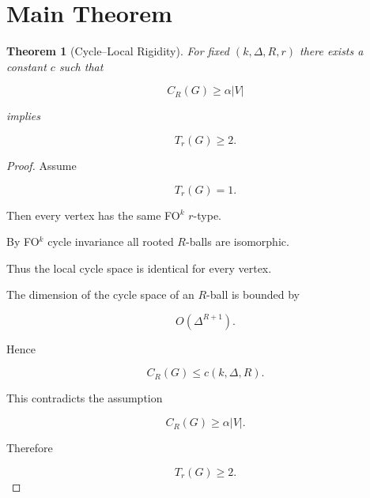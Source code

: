 \documentclass{article}
\newtheorem{theorem}{Theorem}
\begin{document}
\section*{Main Theorem}

\begin{theorem}[Cycle--Local Rigidity]
For fixed $(k,\Delta,R,r)$ there exists a constant $c$ such that

\[
C_R(G)\ge \alpha |V|
\]

implies

\[
T_r(G)\ge 2.
\]

\end{theorem}

\begin{proof}

Assume

\[
T_r(G)=1.
\]

Then every vertex has the same FO$^k$ $r$-type.

By FO$^k$ cycle invariance all rooted $R$-balls are isomorphic.

Thus the local cycle space is identical for every vertex.

The dimension of the cycle space of an $R$-ball is bounded by

\[
O(\Delta^{R+1}).
\]

Hence

\[
C_R(G)\le c(k,\Delta,R).
\]

This contradicts the assumption

\[
C_R(G)\ge \alpha |V|.
\]

Therefore

\[
T_r(G)\ge2.
\]

\end{proof}
\end{document}
